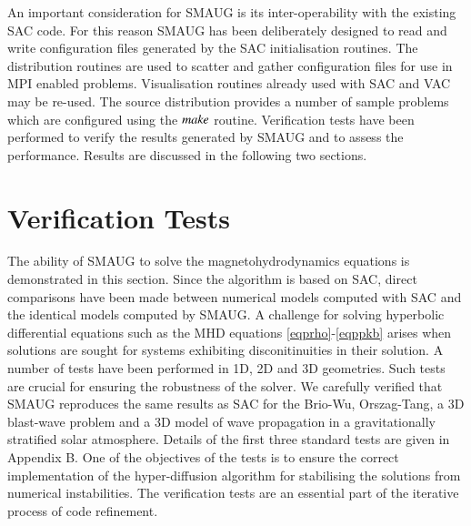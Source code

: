 \documentclass[final,1p]{elsarticle}
\begin{document}
An important consideration for SMAUG is its inter-operability with the existing SAC code. For this reason SMAUG has been deliberately designed to read and write configuration files generated by the SAC initialisation routines. The distribution routines are used to scatter and gather configuration files for use in MPI enabled problems. Visualisation routines already used with SAC and VAC may be re-used. The source distribution provides a number of sample problems which are configured using the $\it{make}$ routine. Verification tests have been performed to verify the results generated by SMAUG and to assess the performance. Results are discussed in the following two sections.

\section{Verification Tests}

The ability of SMAUG to solve the  magnetohydrodynamics equations  is demonstrated in this section. Since the algorithm is based on SAC, direct comparisons have been made between numerical models computed with SAC and the identical models computed by SMAUG.  A challenge for solving hyperbolic differential equations such as the MHD equations  \eqref{eqprho}-\eqref{eqppkb}  arises when solutions are sought for systems exhibiting disconitinuities in their solution.  A number of tests have been performed in 1D, 2D and 3D geometries. Such tests are crucial for ensuring the robustness of  the solver. We carefully verified that SMAUG reproduces the same results as SAC for the Brio-Wu, Orszag-Tang, a 3D blast-wave problem and a 3D model of wave propagation in a gravitationally stratified solar atmosphere. Details of the first three standard tests are given in Appendix B.
One of the objectives of the tests is to ensure the correct implementation of the hyper-diffusion algorithm for stabilising the solutions from numerical instabilities. The verification tests are an essential part of the iterative process of code refinement.
\end{document}
